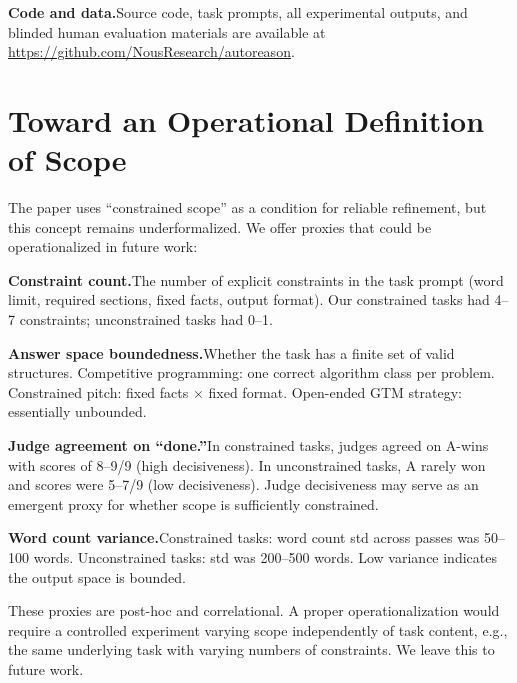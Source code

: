 \documentclass[11pt]{article}
\begin{document}
\textbf{Code and data.}\enspace Source code, task prompts, all experimental outputs, and blinded human evaluation materials are available at \url{https://github.com/NousResearch/autoreason}.

\section{Toward an Operational Definition of Scope}
\label{app:scope}

The paper uses ``constrained scope'' as a condition for reliable refinement, but this concept remains underformalized. We offer proxies that could be operationalized in future work:

\textbf{Constraint count.}\enspace The number of explicit constraints in the task prompt (word limit, required sections, fixed facts, output format). Our constrained tasks had 4--7 constraints; unconstrained tasks had 0--1.

\textbf{Answer space boundedness.}\enspace Whether the task has a finite set of valid structures. Competitive programming: one correct algorithm class per problem. Constrained pitch: fixed facts $\times$ fixed format. Open-ended GTM strategy: essentially unbounded.

\textbf{Judge agreement on ``done.''}\enspace In constrained tasks, judges agreed on A-wins with scores of 8--9/9 (high decisiveness). In unconstrained tasks, A rarely won and scores were 5--7/9 (low decisiveness). Judge decisiveness may serve as an emergent proxy for whether scope is sufficiently constrained.

\textbf{Word count variance.}\enspace Constrained tasks: word count std across passes was 50--100 words. Unconstrained tasks: std was 200--500 words. Low variance indicates the output space is bounded.

These proxies are post-hoc and correlational. A proper operationalization would require a controlled experiment varying scope independently of task content, e.g., the same underlying task with varying numbers of constraints. We leave this to future work.
\end{document}
